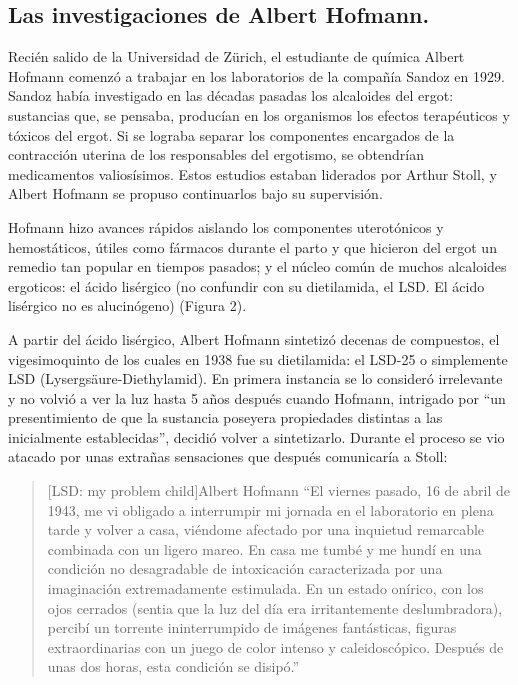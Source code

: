
\subsection{Las investigaciones de Albert Hofmann.}

Recién salido de la Universidad de Zürich, el estudiante de química Albert Hofmann comenzó a trabajar en los laboratorios de la compañía Sandoz en 1929. Sandoz había investigado en las décadas pasadas los alcaloides del ergot: sustancias que, se pensaba, producían en los organismos los efectos terapéuticos y tóxicos del ergot. Si se lograba separar los componentes encargados de la contracción uterina de los responsables del ergotismo, se obtendrían medicamentos valiosísimos. Estos estudios estaban liderados por Arthur Stoll, y Albert Hofmann se propuso continuarlos bajo su supervisión.

Hofmann hizo avances rápidos aislando los componentes uterotónicos y hemostáticos, útiles como fármacos durante el parto y que hicieron del ergot un remedio tan popular en tiempos pasados; y el núcleo común de muchos alcaloides ergoticos: el ácido lisérgico (no confundir con su dietilamida, el LSD. El ácido lisérgico no es alucinógeno) (Figura 2).


A partir del ácido lisérgico, Albert Hofmann sintetizó decenas de compuestos, el vigesimoquinto de los cuales en 1938 fue su dietilamida: el LSD-25 o simplemente LSD (Lysergsäure-Diethylamid). En primera instancia se lo consideró irrelevante y no volvió a ver la luz hasta 5 años después cuando Hofmann, intrigado por “un presentimiento de que la sustancia poseyera propiedades distintas a las inicialmente establecidas”, decidió volver a sintetizarlo. Durante el proceso se vio atacado por unas extrañas sensaciones que después comunicaría a Stoll:

\begin{quote}[LSD: my problem child]{Albert Hofmann}
	\enquote{El viernes pasado, 16 de abril de 1943, me vi obligado a interrumpir mi jornada en el laboratorio en plena tarde y volver a casa, viéndome afectado por una inquietud remarcable combinada con un ligero mareo. En casa me tumbé y me hundí en una condición no desagradable de intoxicación caracterizada por una imaginación extremadamente estimulada. En un estado onírico, con los ojos cerrados (sentia que la luz del día era irritantemente deslumbradora), percibí un torrente ininterrumpido de imágenes fantásticas, figuras extraordinarias con un juego de color intenso y caleidoscópico. Después de unas dos horas, esta condición se disipó.}
\end{quote}

